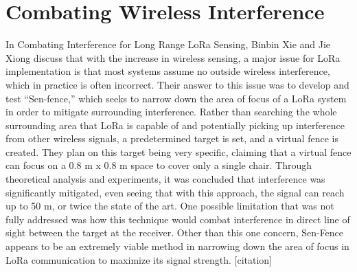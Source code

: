 \documentclass[sigsmall]{acmart}
\begin{document}
\section*{Combating Wireless Interference}
In Combating Interference for Long Range LoRa Sensing, Binbin Xie and Jie Xiong discuss that with the increase in wireless sensing, a major issue for LoRa implementation is that most systems assume no outside wireless interference, which in practice is often incorrect. Their answer to this issue was to develop and test “Sen-fence,” which seeks to narrow down the area of focus of a LoRa system in order to mitigate surrounding interference. Rather than searching the whole surrounding area that LoRa is capable of and potentially picking up interference from other wireless signals, a predetermined target is set, and a virtual fence is created. They plan on this target being very specific, claiming that a virtual fence can focus on a 0.8 m x 0.8 m space to cover only a single chair. Through theoretical analysis and experiments, it was concluded that interference was significantly mitigated, even seeing that with this approach, the signal can reach up to 50 m, or twice the state of the art. One possible limitation that was not fully addressed was how this technique would combat interference in direct line of sight between the target at the receiver. Other than this one concern, Sen-Fence appears to be an extremely viable method in narrowing down the area of focus in LoRa communication to maximize its signal strength.  [citation]
\end{document}
